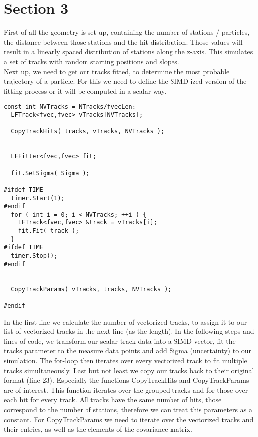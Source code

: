 \documentclass{article}
\begin{document}
\section*{Section 3}
First of all the geometry is set up, containing the number of stations / particles, the distance between those stations and the hit distribution.
Those values will result in a linearly spaced distribution of stations along the z-axis.
This simulates a set of tracks with random starting positions and slopes. \\

\noindent Next up, we need to get our tracks fitted, to determine the most probable
trajectory of a particle. For this we need to define the SIMD-ized version of the fitting process or
it will be computed in a scalar way.



\begin{lstlisting}[caption=KFLineFitter.cpp]
  const int NVTracks = NTracks/fvecLen;
  LFTrack<fvec,fvec> vTracks[NVTracks];
  
  CopyTrackHits( tracks, vTracks, NVTracks );
  
    
  LFFitter<fvec,fvec> fit;

  fit.SetSigma( Sigma );
  
#ifdef TIME
  timer.Start(1);
#endif
  for ( int i = 0; i < NVTracks; ++i ) {
    LFTrack<fvec,fvec> &track = vTracks[i];
    fit.Fit( track );
  }
#ifdef TIME
  timer.Stop();
#endif
  
    
  CopyTrackParams( vTracks, tracks, NVTracks );
  
#endif
\end{lstlisting}

\noindent In the first line we calculate the number of vectorized tracks, to assign it to our
list of vectorized tracks in the next line (as the length). In the following steps and lines of code,
we transform our scalar track data into a SIMD vector, fit the tracks parameter to the measure data points
and add Sigma (uncertainty) to our simulation.
The for-loop then iterates over every vectorized track to fit multiple tracks simultaneously.
Last but not least we copy our tracks back to their original format (line 23).
Especially the functions CopyTrackHits and CopyTrackParams are of interest.
This function iterates over the grouped tracks and for those over each hit for every track.
All tracks have the same number of hits, those correspond to the number of stations, therefore
we can treat this parameters as a constant.
For CopyTrackParams we need to iterate over the vectorized tracks and their entries, as well as the
elements of the covariance matrix. \\
\end{document}
